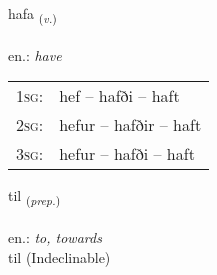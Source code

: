 \documentclass[frontgrid, backgrid]{flacards}\usepackage[]{graphicx}\usepackage[]{xcolor}
\begin{document}
\renewcommand{\blhead}{\vskip5pt {\small\bfseries\footnotesize Sagnorð | Verb }}
\renewcommand{\bcfoot}{\vskip5pt \hspace{2pt}{\small\bfseries\footnotesize 1K}}


{hafa \small{\textsubscript{(\textit{v.})}} \\[1ex] %
\textphonetic{[haːva]} \\
en.: \emph{have} \\  [2ex]
\renewcommand*{\arraystretch}{0.8}
\begin{tabular}{p{1cm}l}
\textsc{1sg}: & hef -- hafði -- haft \\ 
\textsc{2sg}: & hefur -- hafðir -- haft \\ 
\textsc{3sg}: & hefur -- hafði -- haft \\ 
\end{tabular}
}


\renewcommand{\flhead}{\vskip5pt \fboxsep=0pt {\small\bfseries\footnotesize Forsetning | Preposition}}
\renewcommand{\fcfoot}{\vskip5pt \fboxsep=0pt \hspace{2pt}{\small\bfseries\footnotesize 1K}}

\renewcommand{\blhead}{\vskip5pt {\small\bfseries\footnotesize Forsetning | Preposition }}
\renewcommand{\bcfoot}{\vskip5pt \hspace{2pt}{\small\bfseries\footnotesize 1K}}


{til \small{\textsubscript{(\textit{prep.})}} \\[1ex]
\textphonetic{[tʰɪːl]} \\
en.: \emph{to, towards} \\  [2ex]
til (Indeclinable)}

\renewcommand{\flhead}{\vskip5pt \fboxsep=0pt {\small\bfseries\footnotesize Fornafn | Pronoun}}
\renewcommand{\fcfoot}{\vskip5pt \fboxsep=0pt \hspace{2pt}{\small\bfseries\footnotesize 1K}}

\renewcommand{\blhead}{\vskip5pt {\small\bfseries\footnotesize Fornafn | Pronoun }}
\renewcommand{\bcfoot}{\vskip5pt \hspace{2pt}{\small\bfseries\footnotesize 1K}}
\end{document}
